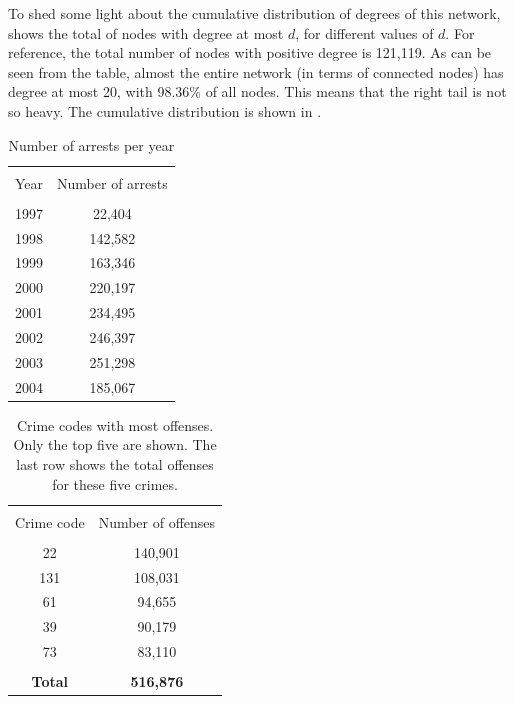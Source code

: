 \documentclass[11pt, english]{article}
\begin{document}
\begin{multicols}{2}
To shed some light about the cumulative distribution of degrees of this network,  shows the total of nodes with degree at most $d$, for different values of $d$. For reference, the total number of nodes with positive degree is 121,119. As can be seen from the table, almost the entire network (in terms of connected nodes) has degree at most 20, with 98.36\% of all nodes. This means that the right tail is not so heavy. The cumulative distribution is shown in .


\begin{table}
	\caption{Number of arrests per year}
	\label{tab:crimes-per-year}
	\centering
	\begin{tabular}{cc}
		\hline\hline
		\\[-1.5ex]
		Year	&	Number of arrests	\\[0.5ex]\hline
		\\[-1.5ex]
		1997	&	\hspace{1ex}22,404	\\[0.2ex]
		1998	&	142,582				\\[0.2ex]
		1999	&	163,346				\\[0.2ex]
		2000	&	220,197				\\[0.2ex]
		2001	&	234,495				\\[0.2ex]
		2002	&	246,397				\\[0.2ex]
		2003	&	251,298				\\[0.2ex]
		2004	&	185,067				\\[0.5ex]
		\hline\hline
	\end{tabular}
	

\end{table}

\begin{table}
	\caption{Crime codes with most offenses. Only the top five are shown. The last row shows the total offenses for these five crimes.}
	\label{tab:notorious-crimes}
	\centering
	\begin{tabular}{cc}
		\hline\hline
		\\[-1.5ex]
		Crime code		&	Number of offenses	\\[0.5ex]\hline
		\\[-1.5ex]
		22				&	140,901	\\[0.2ex]
		131				&	108,031				\\[0.2ex]
		61				&	\hspace{1ex}94,655	\\[0.2ex]
		39				&	\hspace{1ex}90,179	\\[0.2ex]
		73				&	\hspace{1ex}83,110	\\[0.2ex]\hline
		\\[-2ex]
		\textbf{Total}	&	\textbf{516,876}	\\[0.5ex]
		\hline\hline
	\end{tabular}


\end{table}
\end{multicols}
\end{document}
